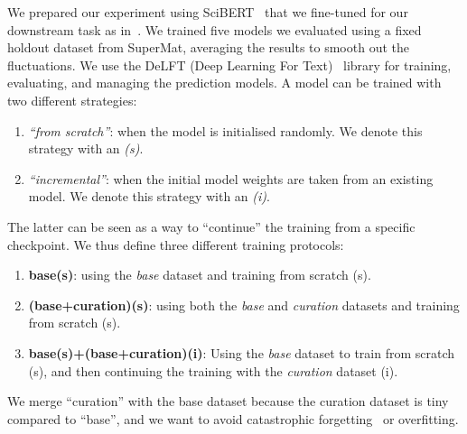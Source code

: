 We prepared our experiment using SciBERT~\cite{Beltagy2019SciBERT} that we fine-tuned for our downstream task as in~\cite{foppiano2023automatic}. 
We trained five models we evaluated using a fixed holdout dataset from SuperMat, averaging the results to smooth out the fluctuations. 
We use the DeLFT (Deep Learning For Text)~\cite{delft} library for training, evaluating, and managing the prediction models.  
A model can be trained with two different strategies: 
\begin{enumerate}
    \item \emph{``from scratch''}: when the model is initialised randomly. We denote this strategy with an \emph{(s)}.
    \item \emph{``incremental''}: when the initial model weights are taken from an existing model. We denote this strategy with an \emph{(i)}.
\end{enumerate}
The latter can be seen as a way to ``continue'' the training from a specific checkpoint.
We thus define three different training protocols: 
\begin{enumerate}
    \item \textbf{base(s)}: using the \emph{base} dataset and training from scratch (s).
    \item \textbf{(base+curation)(s)}: using both the \emph{base} and \emph{curation} datasets and training from scratch (s).
    \item \textbf{base(s)+(base+curation)(i)}: Using the \emph{base} dataset to train from scratch (s), and then continuing the training with the \emph{curation} dataset (i).
\end{enumerate}
We merge ``curation'' with the base dataset because the curation dataset is tiny compared to ``base'', and we want to avoid catastrophic forgetting~\cite{overcoming-kirkpatrick-etal-2016} or overfitting.

